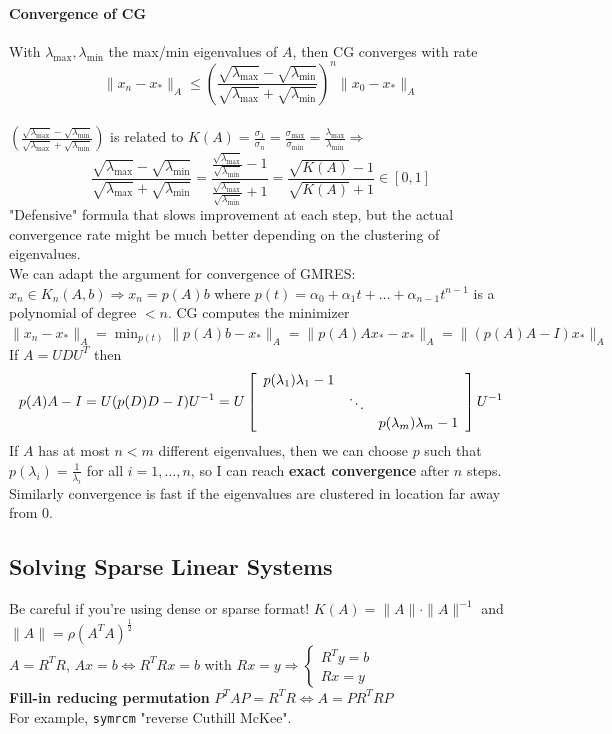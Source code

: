 \documentclass[10pt]{report}
\begin{document}
\paragraph{Convergence of CG} With $\lambda_{\max},\lambda_{\min}$ the max/min eigenvalues of $A$, then CG converges with rate $$\|x_n-x_*\|_A\leq \left(\frac{\sqrt{\lambda_{\max}}-\sqrt{\lambda_{\min}}}{\sqrt{\lambda_{\max}}+\sqrt{\lambda_{\min}}}\right)^n\|x_0-x_*\|_A$$\\
$\left(\frac{\sqrt{\lambda_{\max}}-\sqrt{\lambda_{\min}}}{\sqrt{\lambda_{\max}}+\sqrt{\lambda_{\min}}}\right)$ is related to $K(A) = \frac{\sigma_1}{\sigma_n} = \frac{\sigma_{\max}}{\sigma_{\min}}=\frac{\lambda_{\max}}{\lambda_{\min}} \Rightarrow$ $$\frac{\sqrt{\lambda_{\max}}-\sqrt{\lambda_{\min}}}{\sqrt{\lambda_{\max}}+\sqrt{\lambda_{\min}}} = \frac{\frac{\sqrt{\lambda_{\max}}}{\sqrt{\lambda_{\min}}} - 1}{\frac{\sqrt{\lambda_{\max}}}{\sqrt{\lambda_{\min}}} + 1} = \frac{\sqrt{K(A)}-1}{\sqrt{K(A)}+1}\in [0,1]$$
"Defensive" formula that slows improvement at each step, but the actual convergence rate might be much better depending on the clustering of eigenvalues.\\
We can adapt the argument for convergence of GMRES: $x_n\in K_n(A,b) \Rightarrow x_n = p(A)b$ where $p(t) = \alpha_0 + \alpha_1t + \ldots + \alpha_{n-1}t^{n-1}$ is a polynomial of degree $<n$. CG computes the minimizer $\|x_n-x_*\|_A = \min_{p(t)}\|p(A)b - x_*\|_A = \|p(A)Ax_*-x_*\|_A = \|(p(A)A-I)x_*\|_A$\\
If $A =UDU^T$ then $$p(A)A-I = U(p(D)D-I)U^{-1} = U\left[\begin{array}{c c c}
p(\lambda_1)\lambda_1-1\\
& \ddots \\
& & p(\lambda_m)\lambda_m - 1
\end{array}\right]U^{-1}$$
If $A$ has at most $n<m$ different eigenvalues, then we can choose $p$ such that $p(\lambda_i)=\frac{1}{\lambda_i}$ for all $i=1,\ldots,n$, so I can reach \textbf{exact convergence} after $n$ steps.\\
Similarly convergence is fast if the eigenvalues are clustered in location far away from 0.
\subsection{Solving Sparse Linear Systems}
Be careful if you're using dense or sparse format! $K(A) = \|A\|\cdot\|A\|^{-1}$ and $\|A\|=\rho(A^TA)^{\frac{1}{2}}$\\
$A=R^TR$, $Ax=b\Leftrightarrow R^TRx=b$ with $Rx=y \Rightarrow\left\{\begin{array}{l}
R^Ty = b\\Rx=y
\end{array}\right.$\\
\textbf{Fill-in reducing permutation} $P^TAP = R^TR\Leftrightarrow A = PR^TRP$\\
For example, \texttt{symrcm} "reverse Cuthill McKee".
\end{document}
